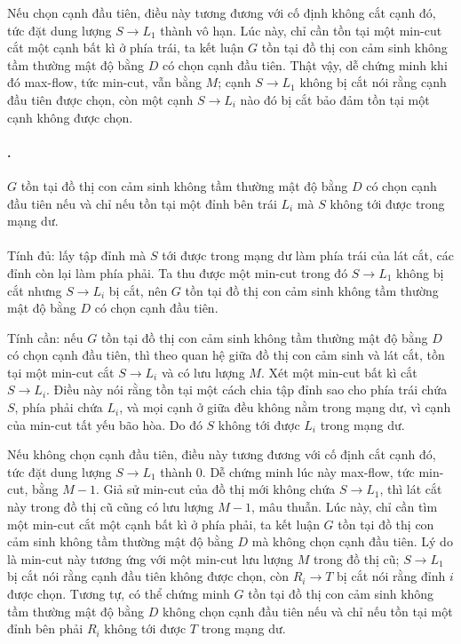 \documentclass[11pt]{article}
\begin{document}
Nếu chọn cạnh đầu tiên, điều này tương đương với cố định không cắt cạnh đó, tức
đặt dung lượng \(S\to L_1\) thành vô hạn. Lúc này, chỉ cần tồn tại một min-cut
cắt một cạnh bất kì ở phía trái, ta kết luận \(G\) tồn tại đồ thị con cảm sinh
không tầm thường mật độ bằng \(D\) có chọn cạnh đầu tiên. Thật vậy, dễ chứng
minh khi đó max-flow, tức min-cut, vẫn bằng \(M\); cạnh \(S\to L_1\) không bị
cắt nói rằng cạnh đầu tiên được chọn, còn một cạnh \(S\to L_i\) nào đó bị cắt
bảo đảm tồn tại một cạnh không được chọn.

\paragraph{.}
\(G\) tồn tại đồ thị con cảm sinh không tầm thường mật độ bằng \(D\) có chọn
cạnh đầu tiên nếu và chỉ nếu tồn tại một đỉnh bên trái \(L_i\) mà \(S\) không
tới được trong mạng dư.

\paragraph{}
Tính đủ: lấy tập đỉnh mà \(S\) tới được trong mạng dư làm phía trái của lát
cắt, các đỉnh còn lại làm phía phải. Ta thu được một min-cut trong đó
\(S\to L_1\) không bị cắt nhưng \(S\to L_i\) bị cắt, nên \(G\) tồn tại đồ thị
con cảm sinh không tầm thường mật độ bằng \(D\) có chọn cạnh đầu tiên.

Tính cần: nếu \(G\) tồn tại đồ thị con cảm sinh không tầm thường mật độ bằng
\(D\) có chọn cạnh đầu tiên, thì theo quan hệ giữa đồ thị con cảm sinh và lát
cắt, tồn tại một min-cut cắt \(S\to L_i\) và có lưu lượng \(M\). Xét một
min-cut bất kì cắt \(S\to L_i\). Điều này nói rằng tồn tại một cách chia tập
đỉnh sao cho phía trái chứa \(S\), phía phải chứa \(L_i\), và mọi cạnh ở giữa
đều không nằm trong mạng dư, vì cạnh của min-cut tất yếu bão hòa. Do đó \(S\)
không tới được \(L_i\) trong mạng dư.

Nếu không chọn cạnh đầu tiên, điều này tương đương với cố định cắt cạnh đó, tức
đặt dung lượng \(S\to L_1\) thành \(0\). Dễ chứng minh lúc này max-flow, tức
min-cut, bằng \(M-1\). Giả sử min-cut của đồ thị mới không chứa \(S\to L_1\),
thì lát cắt này trong đồ thị cũ cũng có lưu lượng \(M-1\), mâu thuẫn. Lúc này,
chỉ cần tìm một min-cut cắt một cạnh bất kì ở phía phải, ta kết luận \(G\) tồn
tại đồ thị con cảm sinh không tầm thường mật độ bằng \(D\) mà không chọn cạnh
đầu tiên. Lý do là min-cut này tương ứng với một min-cut lưu lượng \(M\) trong
đồ thị cũ; \(S\to L_1\) bị cắt nói rằng cạnh đầu tiên không được chọn, còn
\(R_i\to T\) bị cắt nói rằng đỉnh \(i\) được chọn. Tương tự, có thể chứng minh
\(G\) tồn tại đồ thị con cảm sinh không tầm thường mật độ bằng \(D\) không chọn
cạnh đầu tiên nếu và chỉ nếu tồn tại một đỉnh bên phải \(R_i\) không tới được
\(T\) trong mạng dư.
\end{document}

